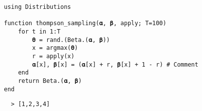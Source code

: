 \documentclass[12pt, oneside]{book}
\title{\booktitle}
\author{\authorname}
\theoremstyle{plain}
\theoremstyle{definition}
\begin{document}
% 

\frontmatter


% 

\newpage
\tableofcontents
% 

\mainmatter
\newpage

\begin{lstlisting}[language=JuliaLocal, style=julia]
using Distributions

function thompson_sampling(𝛂, 𝛃, apply; T=100)
    for t in 1:T
        𝛉 = rand.(Beta.(𝛂, 𝛃))
        x = argmax(𝛉)
        r = apply(x)
        𝛂[x], 𝛃[x] = (𝛂[x] + r, 𝛃[x] + 1 - r) # Comment
    end
    return Beta.(𝛂, 𝛃)
end
\end{lstlisting}
\begin{verbatim}
  > [1,2,3,4]
\end{verbatim}









\end{document}
